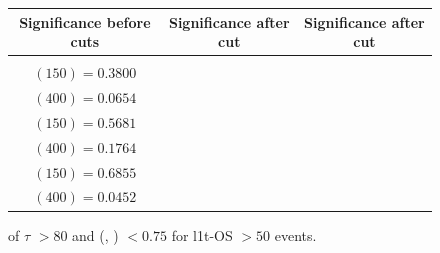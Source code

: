 \documentclass[letterpaper,12pt]{article}
\begin{document}
\begin{figure}[h!]
  \vspace{0.6cm}
  \tiny
  \setlength{\tabcolsep}{20pt}
  \renewcommand{\arraystretch}{1.6}
  \begin{tabular}{|c|c|c|}
    \hline
    Significance before cuts & Significance after \pt{} cut & Significance after \dphi{} cut\\
    \hline
    \Gape[0.2cm]{\makecell{
        \sig{} $(100) = 0.2990$\\
        \sig{} $(150) = 0.3800$\\
        \sig{} $(400) = 0.0654$ }} & 
    \makecell{
      \sig{} $(100) = 0.2305$\\
      \sig{} $(150) = 0.5681$\\
      \sig{} $(400) = 0.1764$} & 
    \makecell{
      \sig{} $(100) = 0.4426$\\
      \sig{} $(150) = 0.6855$\\
      \sig{} $(400) = 0.0452$}\\
    \hline
  \end{tabular}
  \caption{\pt{} of $\tau$ $>80$ and \dphi{} (\ll, \ls) $< 0.75$ for \2l1t-OS \metpt $>50$ events.}
  \label{fig:2l1tc5}
\end{figure}
\vspace{1.5cm}
\end{document}
